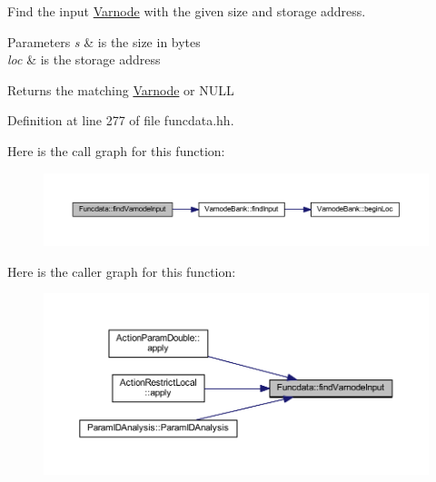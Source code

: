 Find the input \mbox{\hyperlink{class_varnode}{Varnode}} with the given size and storage address. 


\begin{DoxyParams}{Parameters}
{\em s} & is the size in bytes \\
\hline
{\em loc} & is the storage address \\
\hline
\end{DoxyParams}
\begin{DoxyReturn}{Returns}
the matching \mbox{\hyperlink{class_varnode}{Varnode}} or N\+U\+LL 
\end{DoxyReturn}


Definition at line 277 of file funcdata.\+hh.

Here is the call graph for this function\+:
\nopagebreak
\begin{figure}[H]
\begin{center}
\leavevmode
\includegraphics[width=350pt]{class_funcdata_a718cc133e6ade757ee532f0d704c04d4_cgraph}
\end{center}
\end{figure}
Here is the caller graph for this function\+:
\nopagebreak
\begin{figure}[H]
\begin{center}
\leavevmode
\includegraphics[width=350pt]{class_funcdata_a718cc133e6ade757ee532f0d704c04d4_icgraph}
\end{center}
\end{figure}
\mbox{\label{class_funcdata_acb7ae831db646e2f9d64ffb2b51fa7f1}} 
